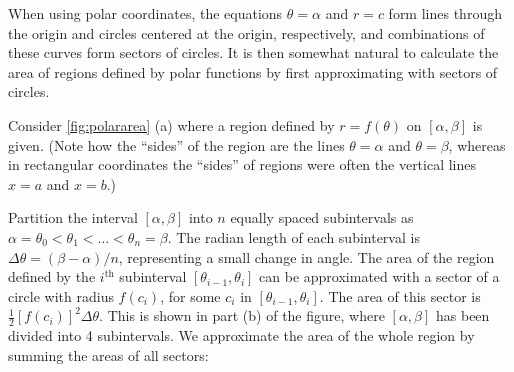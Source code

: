 When using polar coordinates, the equations $\theta=\alpha$ and $r=c$ form lines through the origin and circles centered at the origin, respectively, and combinations of these curves form sectors of circles. It is then somewhat natural to calculate the area of regions defined by polar functions by first approximating with sectors of circles. 

Consider \autoref{fig:polararea} (a) where a region defined by $r=f(\theta)$ on $[\alpha,\beta]$ is given. (Note how the ``sides'' of the region are the lines $\theta=\alpha$ and $\theta=\beta$, whereas in rectangular coordinates the ``sides'' of regions were often the vertical lines $x=a$ and $x=b$.)

Partition the interval $[\alpha,\beta]$ into $n$ equally spaced subintervals as $\alpha=\theta_0<\theta_1<\dotso<\theta_n=\beta$. The radian length of each subinterval is $\Delta\theta = (\beta-\alpha)/n$, representing a small change in angle. The area of the region defined by the $i^{\text{th}}$ subinterval $[\theta_{i-1},\theta_i]$ can be approximated with a sector of a circle with radius $f(c_i)$, for some $c_i$ in $[\theta_{i-1},\theta_i]$. The area of this sector is $\frac12[f(c_i)]^2\Delta\theta$. This is shown in part (b) of the figure, where $[\alpha,\beta]$ has been divided into 4 subintervals. We approximate the area of the whole region by summing the areas of all sectors:
%
